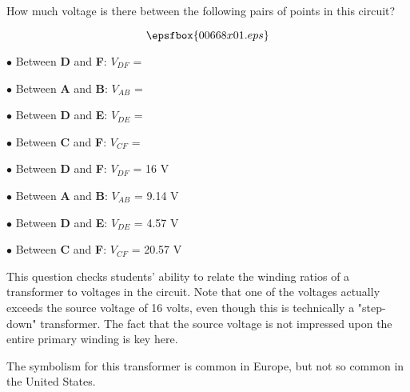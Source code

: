 

How much voltage is there between the following pairs of points in this circuit?

$$\epsfbox{00668x01.eps}$$

\medskip
\item{$\bullet$} Between {\bf D} and {\bf F}: $V_{DF}$ =
\item{$\bullet$} Between {\bf A} and {\bf B}: $V_{AB}$ =
\item{$\bullet$} Between {\bf D} and {\bf E}: $V_{DE}$ =
\item{$\bullet$} Between {\bf C} and {\bf F}: $V_{CF}$ =
\medskip







\medskip
\item{$\bullet$} Between {\bf D} and {\bf F}: $V_{DF}$ = 16 V
\item{$\bullet$} Between {\bf A} and {\bf B}: $V_{AB}$ = 9.14 V
\item{$\bullet$} Between {\bf D} and {\bf E}: $V_{DE}$ = 4.57 V
\item{$\bullet$} Between {\bf C} and {\bf F}: $V_{CF}$ = 20.57 V
\medskip







This question checks students' ability to relate the winding ratios of a transformer to voltages in the circuit.  Note that one of the voltages actually exceeds the source voltage of 16 volts, even though this is technically a "step-down" transformer.  The fact that the source voltage is not impressed upon the entire primary winding is key here.

The symbolism for this transformer is common in Europe, but not so common in the United States.




